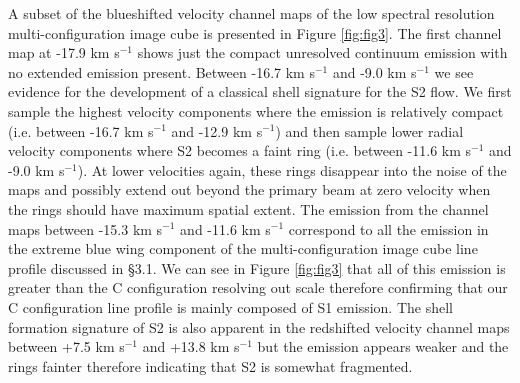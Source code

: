 \documentclass[iop]{emulateapj}
\begin{document}
A subset of the blueshifted velocity channel maps of the low spectral resolution multi-configuration image cube is presented in Figure \ref{fig:fig3}. The first channel map at -17.9 km s${}^{-1}$ shows just the compact unresolved continuum emission with no extended emission present. Between -16.7 km s${}^{-1}$ and -9.0 km s${}^{-1}$ we see evidence for the development of a classical shell signature for the S2 flow. We first sample the highest velocity components where the emission is relatively compact (i.e. between -16.7 km s${}^{-1}$ and -12.9 km s${}^{-1}$) and then sample lower radial velocity components where S2 becomes a faint ring (i.e. between -11.6 km s${}^{-1}$ and -9.0 km s${}^{-1}$). At lower velocities again, these rings disappear into the noise of the maps and possibly extend out beyond the primary beam at zero velocity when the rings should have maximum spatial extent. The emission from the channel maps between -15.3 km s${}^{-1}$ and -11.6 km s${}^{-1}$ correspond to all the emission in the extreme blue wing component of the multi-configuration image cube line profile discussed in \S3.1. We can see in Figure \ref{fig:fig3} that all of this emission is greater than the C configuration resolving out scale therefore confirming that our C configuration line profile is mainly composed of S1 emission. The shell formation signature of S2 is also apparent in the redshifted velocity channel maps between +7.5 km s${}^{-1}$ and +13.8 km s${}^{-1}$ but the emission appears weaker and the rings fainter therefore indicating that S2 is somewhat fragmented. 
\end{document}
